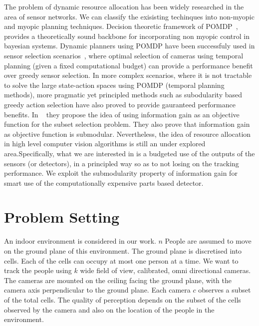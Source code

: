 \documentclass[10pt,twocolumn,letterpaper]{article}
\begin{document}
The problem of dynamic resource allocation has been widely researched in the area of sensor networks. We can classify the exisisting techinques into non-myopic and myopic planning techniques.  Decision theoretic framework of POMDP~\cite{Kaelbling98}, provides a theoretically sound backbone for incorporating non myopic control in bayesian systems. Dynamic planners using POMDP have been successfuly used in sensor selection scenarios~\cite{Spaan09}, where optimal selection of cameras using temporal planning (given a  fixed computational budget) can provide a performance benefit over greedy sensor selection. In more complex scenarios, where it is not tractable to solve the large state-action spaces using POMDP (temporal planning methods), more pragmatic yet principled methods such as subodularity based greedy action selection have also proved to provide gauranteed performance benefits. In ~\cite{krause2012near} they propose the idea of using information gain as an objective function for the subset selection problem. They also prove that information gain as objective function is submodular. Nevertheless, the idea of resource allocation in high level computer vision algorithms is still an under explored area.Specifically, what we are interested in is a budgeted use of the outputs of the sensors (or detectors), in a principled way so as to not losing on the tracking performance. We exploit the submodularity property of information gain for smart use of the computationally expensive parts based detector.


\section{Problem Setting}

An indoor environment is considered in our work. $ n$ People are assumed to move on the ground plane of this environment. The ground plane is discretised into cells. Each of the cells can occupy at most one person at a time. We want to track the people using $ k $ wide field of view, calibrated, omni directional cameras. The cameras are mounted on the ceiling facing the ground plane, with the camera axis perpendicular to the ground plane. Each camera $ c $ observes a subset of the total cells. The quality of perception depends on the subset of the cells observed by the camera and also on the location of the people in the environment.
\end{document}

